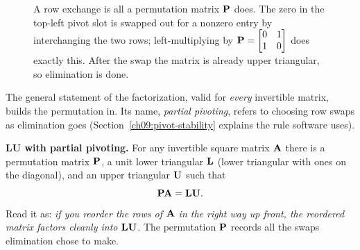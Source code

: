 \begin{figure}[H]
\centering
{}
\caption{A row exchange is all a permutation matrix $\mathbf{P}$ does. The
zero in the top-left pivot slot is swapped out for a nonzero entry by interchanging the two
rows; left-multiplying by $\mathbf{P}=\protect\begin{bmatrix}0&1\\1&0\protect\end{bmatrix}$ does
exactly this. After the swap the matrix is already upper triangular, so elimination is done.}
\label{ch09:fig-swap}
\end{figure}

The general statement of the factorization, valid for \emph{every} invertible matrix,
builds the permutation in. Its name, \emph{partial pivoting}, refers to choosing row swaps as
elimination goes (Section~\ref{ch09:pivot-stability} explains the rule software uses).

\begin{formalbox}
\textbf{LU with partial pivoting.} For any invertible square matrix $\mathbf{A}$ there is a
permutation matrix $\mathbf{P}$, a unit lower triangular $\mathbf{L}$ (lower triangular with ones on the diagonal), and
an upper triangular $\mathbf{U}$ such that
\[
  \mathbf{P}\mathbf{A} = \mathbf{L}\mathbf{U}.
\]
Read it as: \emph{if you reorder the rows of $\mathbf{A}$ in the right way up front, the
reordered matrix factors cleanly into $\mathbf{L}\mathbf{U}$.} The permutation $\mathbf{P}$ records
all the swaps elimination chose to make.
\end{formalbox}

